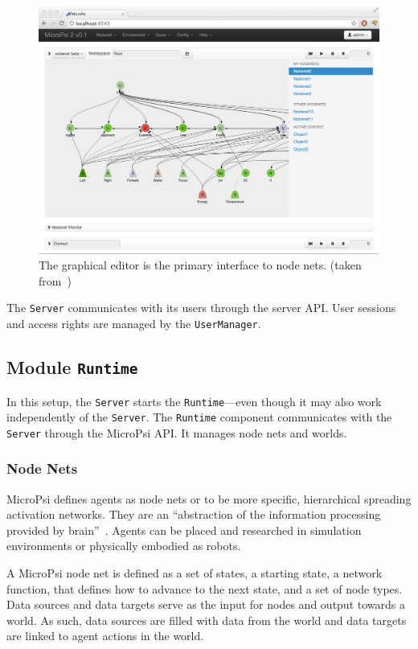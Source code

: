 \begin{figure}[h]
  \centering
    \includegraphics[width=13cm]{graphics/micropsi2_nodenet}
  \caption[The graphical node net editor]{The graphical editor is the primary interface to node nets. (taken from~\cite{conf/agi/Bach12})}
  \label{micropsi2_nodenet}
\end{figure}

The \texttt{Server} communicates with its users through the server API. User sessions and access rights are managed by the \texttt{UserManager}.
   
        \subsection{Module \texttt{Runtime}}
In this setup, the \texttt{Server} starts the \texttt{Runtime}---even though it may also work independently of the \texttt{Server}. The \texttt{Runtime} component communicates with the \texttt{Server} through the MicroPsi API. It manages node nets and worlds.

        \subsubsection{Node Nets}
MicroPsi defines agents as node nets or to be more specific, hierarchical spreading activation networks. They are an ``abstraction of the information processing provided by brain''~\cite{conf/agi/Bach12}. Agents can be placed and researched in simulation environments or physically embodied as robots. 
  
A MicroPsi node net is defined as a set of states, a starting state, a network function, that defines how to advance to the next state, and a set of node types. Data sources and data targets serve as the input for nodes and output towards a world. As such, data sources are filled with data from the world and data targets are linked to agent actions in the world.

